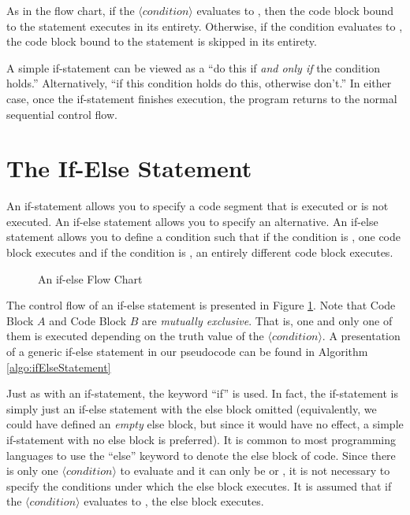 As in the flow chart, if the $\langle condition\rangle$ evaluates to \True, then the 
code block bound to the statement executes in its entirety.  Otherwise, if the
condition evaluates to \False, the code block bound to the statement is
skipped in its entirety.

A simple if-statement can be viewed as a ``do this if \emph{and only if} 
the condition holds.''  Alternatively, ``if this condition holds do this, otherwise 
don't.''  In either case, once the if-statement finishes execution, the program returns
to the normal sequential control flow.  

\section{The If-Else Statement}

An if-statement allows you to specify a code segment that is executed or
is not executed.  An if-else statement allows you to specify an alternative.
An if-else statement allows you to define a condition such that if the 
condition is \True, one code block executes and if the condition is \False, 
an entirely different code block executes.

\begin{figure}
\centering

\caption{An if-else Flow Chart}
\label{figure:ifElseFlowChart}
\end{figure}

%

The control flow of an if-else statement is presented in Figure 
\ref{figure:ifElseFlowChart}.  Note that Code Block $A$ and Code Block $B$ 
are \emph{mutually exclusive}.  That is, one and only one of them 
is executed depending on the truth value of the $\langle condition \rangle$.
A presentation of a generic if-else statement in our pseudocode can
be found in Algorithm \ref{algo:ifElseStatement}

Just as with an if-statement, the keyword ``if'' is used.  In fact, the if-statement
is simply just an if-else statement with the else block omitted (equivalently, we
could have defined an \emph{empty} else block, but since it would have no
effect, a simple if-statement with no else block is preferred).  It is common to
most programming languages to use the ``else'' keyword to denote the else
block of code.  Since there is only one $\langle condition \rangle$ to evaluate
and it can only be \True or \False, it is not necessary to specify the conditions
under which the else block executes.  It is assumed that if the $\langle condition \rangle$
evaluates to \False, the else block executes.  

